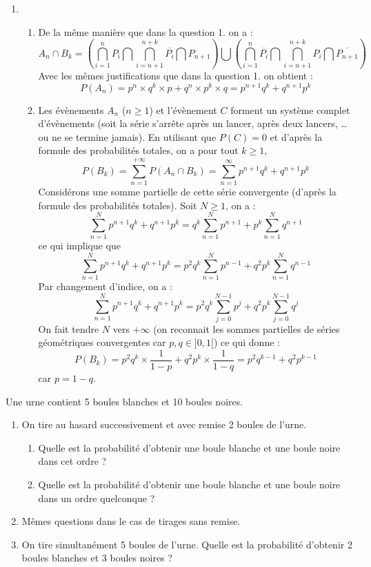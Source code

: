 \documentclass[a4paper,10pt]{report}
\begin{document}
\begin{enumerate}
\item 
\begin{enumerate}
\item De la même manière que dans la question 1. on a :
\[ A_n \cap B_k = \left( \bigcap_{i=1}^n P_i \bigcap \bigcap_{i=n+1}^{n+k} \overline{P_i} \bigcap P_{n+1} \right) \bigcup \left( \bigcap_{i=1}^n \overline{P_i} \bigcap \bigcap_{i=n+1}^{n+k} P_i \bigcap \overline{P_{n+1}} \right) \]
Avec les mêmes justifications que dans la question 1. on obtient :
\[ P(A_n) = p^n \times q^k \times p + q^n \times p^k \times q = p^{n+1} q^k + q^{n+1} p^k \]
\item Les évènements $A_n$ ($n \geq 1$) et l'évènement $C$ forment un système complet d'évènements (soit la série s'arrête après un lancer, après deux lancers, \ldots ou ne se termine jamais). En utilisant que $P(C)=0$ et d'après la formule des probabilités totales, on a pour tout $k \geq 1$,
\[ P(B_k) = \sum_{n=1}^{+ \infty} P(A_n \cap B_k) = \sum_{n=1}^{\infty} p^{n+1} q^k + q^{n+1} p^k \]
Considérons une somme partielle de cette série convergente (d'après la formule des probabilités totales). Soit $N \geq 1$, on a :
\[ \sum_{n=1}^N p^{n+1} q^k +q^{n+1} p^k = q^k \sum_{n=1}^N p^{n+1} + p^k \sum_{n=1}^N q^{n+1} \]
ce qui implique que 
\[ \sum_{n=1}^N p^{n+1} q^k +q^{n+1} p^k = p^2 q^k \sum_{n=1}^N p^{n-1} + q^2p^k \sum_{n=1}^N q^{n-1} \]
Par changement d'indice, on a :
\[ \sum_{n=1}^N p^{n+1} q^k +q^{n+1} p^k = p^2 q^k \sum_{j=0}^{N-1} p^{j} + q^2p^k \sum_{j=0}^{N-1} q^{j} \]
On fait tendre $N$ vers $+\infty$ (on reconnait les sommes partielles de séries géométriques convergentes car $p,q \in ]0,1[$) ce qui donne :
\[ P(B_k) = p^2 q^k \times \frac{1}{1-p} + q^2 p^k \times \frac{1}{1-q} = p^2 q^{k-1} + q^2 p^{k-1} \]
car $p=1-q$.
\end{enumerate}
\end{enumerate}

\begin{Exa} Une urne contient 5 boules blanches et 10 boules noires.

\begin{enumerate}
\item On tire au hasard successivement et avec remise 2 boules de l'urne.
\begin{enumerate}
\item Quelle est la probabilité d'obtenir une boule blanche et une boule noire dans cet ordre ?
\item Quelle est la probabilité d'obtenir une boule blanche et une boule noire dans un ordre quelconque ?
\end{enumerate}
\item Mêmes questions dans le cas de tirages sans remise.
\item On tire simultanément 5 boules de l'urne. Quelle est la probabilité d'obtenir 2 boules blanches et 3 boules noires ?
\end{enumerate}
\end{Exa}
\end{document}
